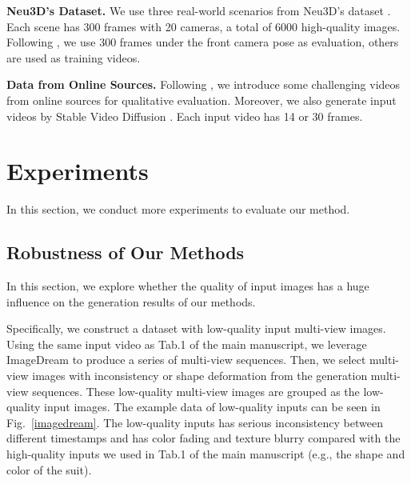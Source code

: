 \textbf{Neu3D's Dataset.} We use three real-world scenarios from Neu3D's dataset \cite{li2022neural}. Each scene has 300 frames with 20 cameras, a total of 6000 high-quality images. Following \cite{wu20244d}, we use 300 frames under the front camera pose as evaluation, others are used as training videos.

\textbf{Data from Online Sources.} Following \cite{zeng2024stag4d}, we introduce some challenging videos from online sources for qualitative evaluation. Moreover, we also generate input videos by Stable Video Diffusion \cite{blattmann2023stable}. Each input video has 14 or 30 frames.

\section{Experiments}
In this section, we conduct more experiments to evaluate our method.


\subsection{Robustness of Our Methods} \label{robust}
In this section, we explore whether the quality of input images has a huge influence on the generation results of our methods. 

Specifically, we construct a dataset with low-quality input multi-view images. Using the same input video as Tab.1 of the main manuscript, we leverage ImageDream \cite{wang2023imagedream} to produce a series of multi-view sequences. Then, we select multi-view images with inconsistency or shape deformation from the generation multi-view sequences. These low-quality multi-view images are grouped as the low-quality input images. The example data of low-quality inputs can be seen in Fig.~\ref{imagedream}. The low-quality inputs has serious inconsistency between different timestamps and has color fading and texture blurry compared with the high-quality inputs we used in Tab.1 of the main manuscript (e.g., the shape and color of the suit). 

